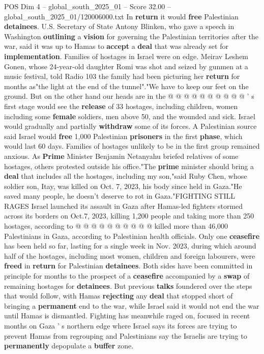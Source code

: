 \begin{textsample}{POS Dim 4 – global\_south\_2025\_01 – Score 32.00 – global\_south\_2025\_01/120006000.txt}
In \textbf{return} it would \textbf{free} Palestinian \textbf{detainees}.
U.S.
Secretary of State Antony Blinken, who gave a speech in Washington \textbf{outlining} a \textbf{vision} for governing the Palestinian territories after the war, said it was up to Hamas to \textbf{accept} a \textbf{deal} that was already set for \textbf{implementation}.
Families of hostages in Israel were on edge.
Meirav Leshem Gonen, whose 24-year-old daughter Romi was shot and seized by gunmen at a music festival, told Radio 103 the family had been picturing her \textbf{return} for months as"the light at the end of the tunnel"."We have to keep our feet on the ground.
But on the other hand our heads are in the @ @ @ @ @ @ @ @ @ @ ' s first stage would see the \textbf{release} of 33 hostages, including children, women including some \textbf{female} soldiers, men above 50, and the wounded and sick.
Israel would gradually and partially \textbf{withdraw} some of its forces.
A Palestinian source said Israel would \textbf{free} 1,000 Palestinian \textbf{prisoners} in the first \textbf{phase}, which would last 60 days.
Families of hostages unlikely to be in the first group remained anxious.
As \textbf{Prime} Minister Benjamin Netanyahu briefed relatives of some hostages, others protested outside his office."The \textbf{prime} minister should bring a \textbf{deal} that includes all the hostages, including my son,"said Ruby Chen, whose soldier son, Itay, was killed on Oct. 7, 2023, his body since held in Gaza."He saved many people, he doesn't deserve to rot in Gaza."FIGHTING STILL RAGES Israel launched its assault in Gaza after Hamas-led fighters stormed across its borders on Oct.7, 2023, killing 1,200 people and taking more than 250 hostages, according to @ @ @ @ @ @ @ @ @ @ killed more than 46,000 Palestinians in Gaza, according to Palestinian health officials.
Only one \textbf{ceasefire} has been held so far, lasting for a single week in Nov. 2023, during which around half of the hostages, including most women, children and foreign labourers, were \textbf{freed} in \textbf{return} for Palestinian \textbf{detainees}.
Both sides have been committed in principle for months to the prospect of a \textbf{ceasefire} accompanied by a \textbf{swap} of remaining hostages for \textbf{detainees}.
But previous \textbf{talks} foundered over the steps that would follow, with Hamas \textbf{rejecting} any \textbf{deal} that stopped short of bringing a \textbf{permanent} end to the war, while Israel said it would not end the war until Hamas is dismantled.
Fighting has meanwhile raged on, focused in recent months on Gaza ' s northern edge where Israel says its forces are trying to prevent Hamas from regrouping and Palestinians say the Israelis are trying to \textbf{permanently} depopulate a \textbf{buffer} zone.

\end{textsample}
